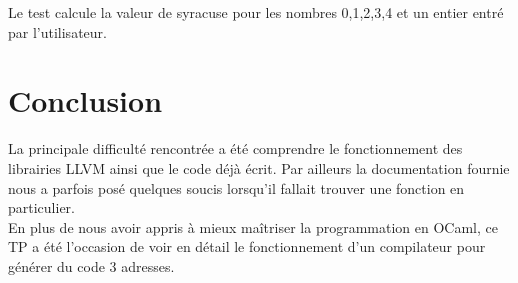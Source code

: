 \documentclass{article}
\begin{document}
Le test calcule la valeur de syracuse pour les nombres 0,1,2,3,4 et un entier entré par l'utilisateur.

\section{Conclusion}
La principale difficulté rencontrée a été comprendre le fonctionnement des librairies LLVM ainsi que
le code déjà écrit. Par ailleurs la documentation fournie nous a parfois posé quelques soucis lorsqu'il fallait trouver une fonction en particulier.\\
En plus de nous avoir appris à mieux maîtriser la programmation en OCaml, ce TP a été l'occasion de voir en détail le fonctionnement d'un compilateur pour générer du code 3 adresses. 

\end{document}
